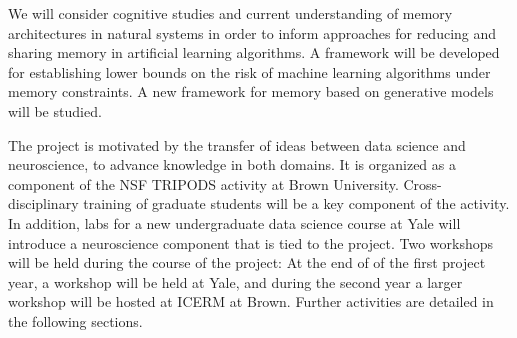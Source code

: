 We will consider cognitive studies and
current understanding of memory architectures in natural systems
in order to inform approaches for reducing and sharing memory in
artificial learning algorithms. A framework will be developed for
establishing lower bounds on the risk of machine learning algorithms under
memory constraints. A new framework for memory based on generative models
will be studied.
\vskip5pt

The project is motivated by the transfer of ideas between data science and neuroscience,
to advance knowledge in both domains. It is organized as a component
of the NSF TRIPODS activity at Brown University. Cross-disciplinary
training of graduate students will be a key component of the
activity. In addition, labs for a new undergraduate data science
course at Yale will introduce a neuroscience component that is tied to
the project. Two workshops will be held during the course of the
project: At the end of of the first project year, a workshop will be held at Yale, and 
during the second year a larger workshop will be hosted at ICERM at Brown. Further
activities are detailed in the following sections.
